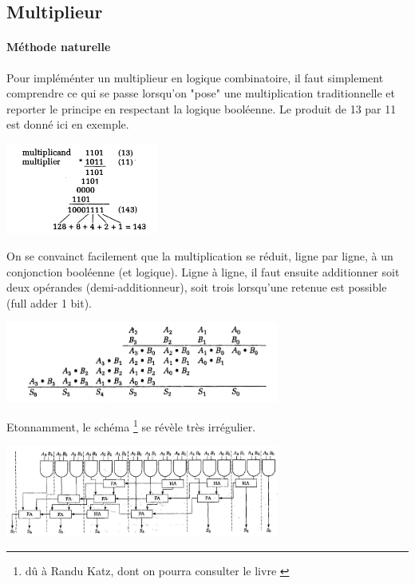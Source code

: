 \subsection{Multiplieur}
\paragraph{Méthode naturelle}

Pour impléménter un multiplieur en logique combinatoire, il faut simplement comprendre ce qui se passe lorsqu'on "pose" une multiplication traditionnelle et reporter
le principe en respectant la logique booléenne. Le produit de 13 par 11 est donné ici en exemple.

\begin{center}
  \centering
  \includegraphics[width=5cm]{./figures/mult-1.png}
\end{center}

On se convainct facilement que la multiplication se réduit, ligne par ligne,
à un conjonction booléenne (et logique). Ligne à ligne, il faut ensuite additionner soit deux opérandes (demi-additionneur), soit trois lorsqu'une retenue est possible (full adder 1 bit).


\begin{center}
  \centering
  \includegraphics[width=9cm]{./figures/mult-2.png}
\end{center}

Etonnamment, le schéma \footnote{dû à Randu Katz, dont on pourra consulter le livre \cite{Katz}} se révèle très irrégulier.

\begin{center}
  \centering
  \includegraphics[width=9cm]{./figures/mult-3.png}
\end{center}

